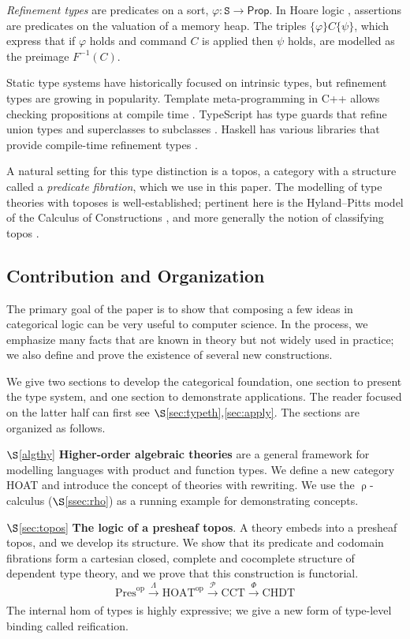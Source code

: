 \documentclass[conference]{IEEEtran}
\theoremstyle{definition}
\newcommand{\msf}[1]{\mathsf{#1}}
\newcommand{\msc}[1]{\mathscr{#1}}
\newcommand{\mrm}[1]{\mathrm{#1}}
\newcommand{\mtt}[1]{\mathtt{#1}}
\newcommand{\xr}[2]{\xrightarrow[#2]{#1}}
\newcommand{\op}{\mrm{op}}
\newcommand{\HOAT}{\mrm{HOAT}}
\newcommand{\pow}{\msc{P}}
\newcommand{\tts}{\mtt{S}}
\begin{document}
\textit{Refinement types} are predicates on a sort, $\varphi:\tts\to \msf{Prop}$. In Hoare logic \cite{hoare}, assertions are predicates on the valuation of a memory heap. The triples $\{\varphi\}C\{\psi\}$, which express that if $\varphi$ holds and command $C$ is applied then $\psi$ holds, are modelled as the preimage $F^{-1}(C)$.

Static type systems have historically focused on intrinsic types, but refinement types are growing in popularity. Template meta-programming in C++ allows checking propositions at compile time \cite{template}. TypeScript has type guards that refine union types and superclasses to subclasses \cite{typeguards}. Haskell has various libraries that provide compile-time refinement types \cite{haskellrefinement}.

A natural setting for this type distinction is a topos, a category with a structure called a \textit{predicate fibration}, which we use in this paper. The modelling of type theories with toposes is well-established; pertinent here is the Hyland--Pitts model of the Calculus of Constructions \cite{cocmodel}, and more generally the notion of classifying topos \cite[X]{sheavesinGL}.

\subsection{Contribution and Organization}

The primary goal of the paper is to show that composing a few ideas in categorical logic can be very useful to computer science. In the process, we emphasize many facts that are known in theory but not widely used in practice; we also define and prove the existence of several new constructions.

We give two sections to develop the categorical foundation, one section to present the type system, and one section to demonstrate applications. The reader focused on the latter half can first see $\S$\ref{sec:typeth},\ref{sec:apply}. The sections are organized as follows.

$\S$\ref{algthy} \textbf{Higher-order algebraic theories} \cite{hoat} are a general framework for modelling languages with product and function types. We define a new category HOAT and introduce the concept of theories with rewriting. We use the $\uprho$-calculus ($\S$\ref{ssec:rho}) as a running example for demonstrating concepts.

$\S$\ref{sec:topos} \textbf{The logic of a presheaf topos}. A theory embeds into a presheaf topos, and we develop its structure. We show that its predicate and codomain fibrations form a cartesian closed, complete and cocomplete structure of dependent type theory, and we prove that this construction is functorial.
\[\mrm{Pres}^\op \xr{\Lambda}{} \HOAT^\op\xr{\pow}{} \mrm{CCT} \xr{\Phi}{} \mrm{CHDT}\]
The internal hom of types is highly expressive; we give a new form of type-level binding called reification.
\end{document}
